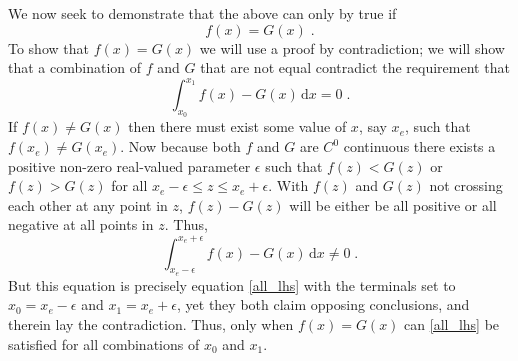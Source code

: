 \documentclass[12pt]{scrartcl}
\newcommand{\dx}[1]{\ensuremath{\,\mathrm{d}#1}}
\begin{document}
We now seek to demonstrate that the above can only by true if
\[ f(x) = G(x) \; . \]
To show that $f(x) = G(x)$ we will use a proof by contradiction; we will show that a combination of $f$ and $G$ that are not equal contradict the requirement that
\[ \int^{x_1}_{x_0} f(x) - G(x) \dx{x} = 0 \; . \]
If $f(x) \ne G(x)$ then there must exist some value of $x$, say $x_e$, such that $f(x_e) \ne G(x_e)$. Now because both $f$ and $G$ are $C^0$ continuous there exists a positive non-zero real-valued parameter $\epsilon$ such that $f(z) \lt G(z)$ or $f(z) \gt G(z)$ for all $x_e - \epsilon \le z \le x_e + \epsilon$. With $f(z)$ and $G(z)$ not crossing each other at any point in $z$, $f(z) - G(z)$ will be either be all positive or all negative at all points in $z$. Thus,
\[ \int_{x_e - \epsilon}^{x_e + \epsilon} f(x) - G(x) \dx{x} \ne 0 \; . \]
But this equation is precisely equation \eqref{all_lhs} with the terminals set to $x_0 = x_e - \epsilon$ and $x_1 = x_e + \epsilon$, yet they both claim opposing conclusions, and therein lay the contradiction. Thus, only when $f(x) = G(x)$ can \eqref{all_lhs} be satisfied for all combinations of $x_0$ and $x_1$.
\end{document}
